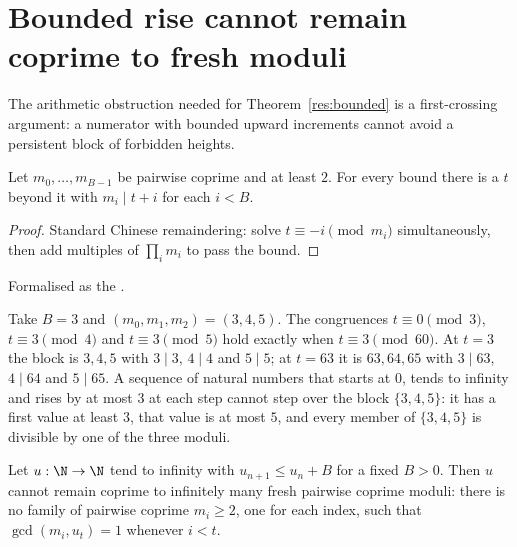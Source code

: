 \section{Bounded rise cannot remain coprime to fresh moduli}\label{sec:barrier}

The arithmetic obstruction needed for Theorem~\ref{res:bounded} is a
first-crossing argument: a numerator with bounded upward increments cannot
avoid a persistent block of forbidden heights.

\begin{lemma}\label{res:crt}
Let $m_0,\ldots,m_{B-1}$ be pairwise coprime and at least $2$.  For every bound
there is a $t$ beyond it with $m_i\mid t+i$ for each $i<B$.
\end{lemma}

\begin{proof}
Standard Chinese remaindering: solve $t\equiv-i \pmod{m_i}$ simultaneously,
then add multiples of $\prod_i m_i$ to pass the bound.
\end{proof}

\noindent Formalised as the
.

\begin{example}\label{ex:crt}
Take $B=3$ and $(m_0,m_1,m_2)=(3,4,5)$.  The congruences $t\equiv0\pmod3$,
$t\equiv3\pmod4$ and $t\equiv3\pmod5$ hold exactly when $t\equiv3\pmod{60}$.
At $t=3$ the block is $3,4,5$ with $3\mid3$, $4\mid4$ and $5\mid5$; at $t=63$
it is $63,64,65$ with $3\mid63$, $4\mid64$ and $5\mid65$.  A sequence of
natural numbers that starts at $0$, tends to infinity and rises by at most $3$
at each step cannot step over the block $\{3,4,5\}$: it has a first value at
least $3$, that value is at most $5$, and every member of $\{3,4,5\}$ is
divisible by one of the three moduli.
\end{example}

\begin{theorem}\label{res:barrier}
Let $u:\N\to\N$ tend to infinity with $u_{n+1}\le u_n+B$ for a fixed $B>0$.
Then $u$ cannot remain coprime to infinitely many fresh pairwise coprime
moduli: there is no family of pairwise coprime $m_i\ge2$, one for each index,
such that $\gcd(m_i,u_t)=1$ whenever $i<t$.
\end{theorem}

